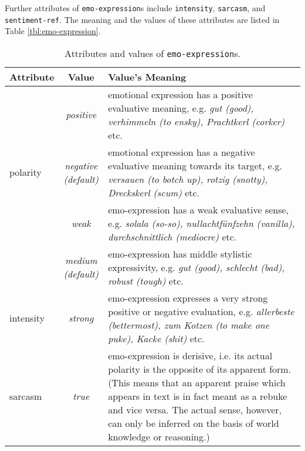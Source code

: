 \documentclass[11pt,a4paper]{article}
\newlength{\clmnwidth}
\theoremstyle{mytheoremstyle}
\begin{document}
Further attributes of \texttt{emo-expression}s include
\texttt{intensity}, \texttt{sarcasm}, and \texttt{sentiment-ref}.  The
meaning and the values of these attributes are listed in Table
\ref{tbl:emo-expression}.
\begin{center}
  \begin{table}[ht]
    \caption{Attributes and values of \texttt{emo-expression}s.}
    \begin{tabular}{|l|c|p{0.935\clmnwidth}|}\hline
      Attribute & Value & Value's Meaning\\\hline

      & \textit{positive} & emotional expression has a positive
      evaluative meaning, e.g. \textit{gut (good), verhimmeln (to
        ensky), Prachtkerl (corker)} etc.\\\cline{2-3}

      \multirow{-2}{*}{polarity} & \textit{negative\newline(default)}
      & emotional expression has a negative evaluative meaning towards
      its target, e.g. \textit{versauen (to botch up), rotzig
        (snotty), Dreckskerl (scum)} etc.\\\hline


      & \textit{weak} & emo-expression has a weak evaluative sense,
      e.g. \textit{solala (so-so), nullachtf\"unfzehn (vanilla),
        durchschnittlich (mediocre)} etc.\\\cline{2-3}

      & \textit{medium\newline(default)} & emo-expression has middle
      stylistic expressivity, e.g. \textit{gut (good), schlecht (bad),
        robust (tough)} etc.\\\cline{2-3}

      \multirow{-3}{*}{intensity} & \textit{strong} & emo-expression
      expresses a very strong positive or negative evaluation,
      e.g. \textit{allerbeste (bettermost), zum Kotzen (to make one
        puke), Kacke (shit)} etc.\\\hline


      \multirow{2}{*}{sarcasm} & \textit{true} & emo-expression is
      derisive, i.e. its actual polarity is the opposite of its
      apparent form. (This means that an apparent praise which appears
      in text is in fact meant as a rebuke and vice versa. The actual
      sense, however, can only be inferred on the basis of world
      knowledge or reasoning.)\\\cline{2-3}


\end{tabular}
\end{table}
\end{center}
\end{document}
